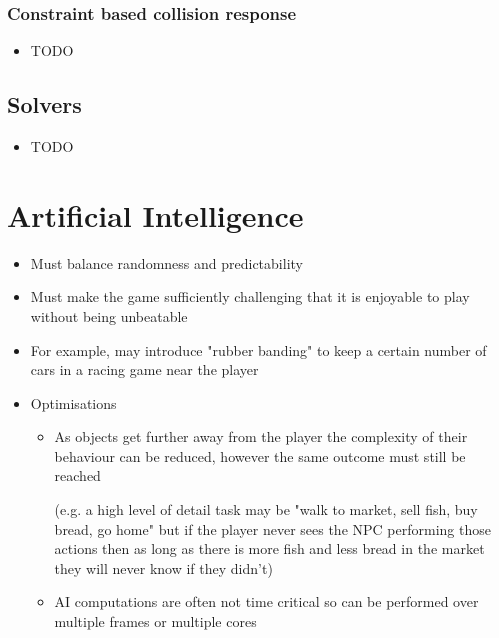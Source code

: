 \documentclass[a4paper]{article}
\begin{document}
\subsubsection{Constraint based collision response}

\begin{itemize}
  \item
    TODO

\end{itemize}

\subsection{Solvers}

\begin{itemize}
  \item
    TODO

\end{itemize}

\section{Artificial Intelligence}

\begin{itemize}
  \item
    Must balance randomness and predictability

  \item
    Must make the game sufficiently challenging that it is enjoyable to play
    without being unbeatable

  \item
    For example, may introduce "rubber banding" to keep a certain number of cars
    in a racing game near the player

  \item
    Optimisations
    \begin{itemize}
      \item
        As objects get further away from the player the complexity of their
        behaviour can be reduced, however the same outcome must still be reached

        (e.g. a high level of detail task may be "walk to market, sell fish, buy
        bread, go home" but if the player never sees the NPC performing those
        actions then as long as there is more fish and less bread in the market
        they will never know if they didn't)

      \item
        AI computations are often not time critical so can be performed over
        multiple frames or multiple cores

    \end{itemize}

\end{itemize}
\end{document}
